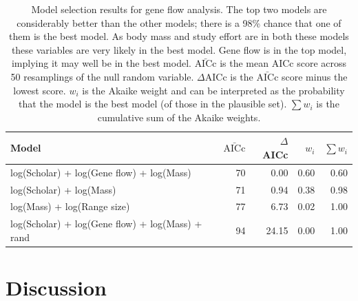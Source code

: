 \begin{table}[t]
\begin{tabular}{>{\small}lrrrr}

\normalsize{Model} & $\bar{\text{AICc}}$ & $\Delta$AICc & $w_i$ & $\sum w_i$\\
\hline
log(Scholar) + log(Gene flow) + log(Mass) & 
70 & 0.00 &
0.60 & 0.60\\
log(Scholar) + log(Mass) & 
71 & 0.94 &
0.38 & 0.98\\
log(Mass) + log(Range size) & 
77 & 6.73 &
0.02 & 1.00\\
log(Scholar) + log(Gene flow) + log(Mass) + rand &
94 & 24.15 &
0.00 & 1.00
\end{tabular}
\caption[Model selection results for gene flow analysis]{
Model selection results for gene flow analysis. 
The top two models are considerably better than the other models; there is a 98\% chance that one of them is the best model.
As body mass and study effort are in both these models these variables are very likely in the best model.
Gene flow is in the top model, implying it may well be in the best model.
$\bar{\text{AICc}}$ is the mean AICc score across 50 resamplings of the null random variable. 
$\Delta$AICc is the $\bar{\text{AICc}}$ score minus the lowest score. 
$w_i$ is the Akaike weight and can be interpreted as the probability that the model is the best model (of those in the plausible set).
$\sum w_i$ is the cumulative sum of the Akaike weights.}
\label{t:fstmodels}
\end{table}





\clearpage
\section{Discussion}  

















